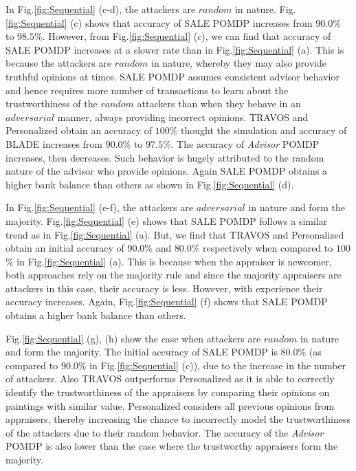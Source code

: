 \documentclass{aamas2014}
\providecommand{\SALEP}{SALE POMDP}
\begin{document}
In Fig.\ref{fig:Sequential} (c-d), the attackers are $random$ in nature. Fig.\ref{fig:Sequential} (c) shows that accuracy of  \SALEP{} increases from $90.0$\% to $98.5$\%. However, from Fig.\ref{fig:Sequential} (c), we can find that accuracy of \SALEP{} increases at a slower rate than in  Fig.\ref{fig:Sequential} (a). This is because the attackers are $random$ in nature, whereby they may also provide truthful opinions at times. \SALEP{} assumes consistent advisor behavior and hence requires more number of transactions to learn about the trustworthiness of the $random$ attackers than when they behave in an $adversarial$ manner, always providing incorrect opinions. TRAVOS and Personalized obtain an accuracy of $100$\% thought the simulation and accuracy of BLADE increases from $90.0$\% to $97.5$\%. The accuracy of \textit{Advisor} POMDP increases, then decreases. Such behavior is hugely attributed to the random nature of the advisor who provide opinions. Again \SALEP{} obtains a higher bank balance than others as shown in Fig.\ref{fig:Sequential} (d).

In Fig.\ref{fig:Sequential} (e-f), the attackers are $adversarial$ in nature and form the majority. Fig.\ref{fig:Sequential} (e) shows that \SALEP{} follows a similar trend as in Fig.\ref{fig:Sequential} (a). But, we find that TRAVOS and Personalized obtain an initial accuracy of $90.0$\% and $80.0$\% respectively when compared to $100$\% in Fig.\ref{fig:Sequential} (a). This is because when the appraiser is newcomer, both approaches rely on the majority rule and since the majority appraisers are attackers in this case, their accuracy is less. However, with experience their accuracy increases.  Again, Fig.\ref{fig:Sequential} (f) shows that \SALEP{} obtains a higher bank balance than others.

Fig.\ref{fig:Sequential} (g), (h) show the case when attackers are $random$ in nature and form the majority. The initial accuracy of  \SALEP{} is $80.0$\% (as compared to $90.0$\% in Fig.\ref{fig:Sequential} (c)), due to the increase in the number of attackers. Also TRAVOS outperforms Personalized as it is able to correctly identify the trustworthiness of the appraisers by comparing their opinions on paintings with similar value. Personalized considers all previous opinions from appraisers, thereby increasing the chance to incorrectly model the trustworthiness of the attackers due to their random behavior. The accuracy of the \textit{Advisor} POMDP is also lower than the case where the trustworthy appraisers form the majority.
\end{document}
